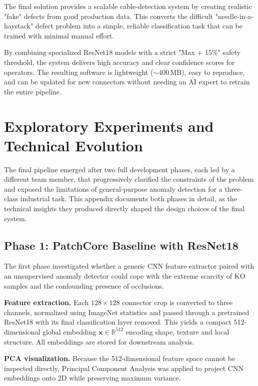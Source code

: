 \documentclass[11pt,a4paper]{article}
\begin{document}
The final solution provides a scalable cable-detection system by creating realistic "fake" defects from good production data. This converts the difficult "needle-in-a-haystack" defect problem into a simple, reliable classification task that can be trained with minimal manual effort.

By combining specialized ResNet18 models with a strict "Max + 15\%" safety threshold, the system delivers high accuracy and clear confidence scores for operators. The resulting software is lightweight ($\sim$400\,MB), easy to reproduce, and can be updated for new connectors without needing an AI expert to retrain the entire pipeline.

\newpage
\appendix
\section{Exploratory Experiments and Technical Evolution}

The final pipeline emerged after two full development phases, each led by a different team member, that progressively clarified the constraints of the problem and exposed the limitations of general-purpose anomaly detection for a three-class industrial task. This appendix documents both phases in detail, as the technical insights they produced directly shaped the design choices of the final system.

\subsection{Phase 1: PatchCore Baseline with ResNet18}

The first phase investigated whether a generic CNN feature extractor paired with an unsupervised anomaly detector could cope with the extreme scarcity of KO samples and the confounding presence of occlusions.

\textbf{Feature extraction.} Each $128 \times 128$ connector crop is converted to three channels, normalized using ImageNet statistics and passed through a pretrained ResNet18 with its final classification layer removed. This yields a compact 512-dimensional global embedding $\mathbf{x} \in \mathbb{R}^{512}$ encoding shape, texture and local structure. All embeddings are stored for downstream analysis.

\textbf{PCA visualization.} Because the 512-dimensional feature space cannot be inspected directly, Principal Component Analysis was applied to project CNN embeddings onto 2D while preserving maximum variance.
\end{document}

